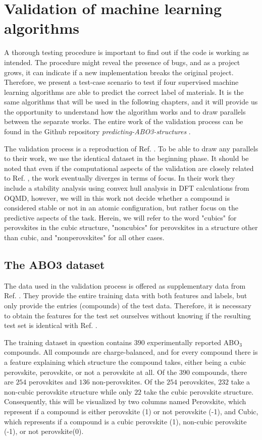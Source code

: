 \chapter{Validation of machine learning algorithms}
\label{chap:validation}

A thorough testing procedure is important to find out if the code is working as intended. The procedure might reveal the presence of bugs, and as a project grows, it can indicate if a new implementation breaks the original project. Therefore, we present a test-case scenario to test if four supervised machine learning algorithms are able to predict the correct label of materials. It is the same algorithms that will be used in the following chapters, and it will provide us the opportunity to understand how the algorithm works and to draw parallels between the separate works. The entire work of the validation process can be found in the Github repository \textit{predicting-ABO3-structures} \cite{Ohebbi2021a}.

The validation process is a reproduction of Ref. \cite{Balachandran2018}. To be able to draw any parallels to their work, we use the identical dataset in the beginning phase. It should be noted that even if the computational aspects of the validation are closely related to Ref. \cite{Balachandran2018}, the work eventually diverges in terms of focus. In their work they include a stability analysis using convex hull analysis in DFT calculations from OQMD, however, we will in this work not decide whether a compound is considered stable or not in an atomic configuration, but rather focus on the predictive aspects of the task. Herein, we will refer to the word "cubics" for perovskites in the cubic structure, "noncubics" for perovskites in a structure other than cubic, and "nonperovskites" for all other cases.

\section{The ABO3 dataset}

The data used in the validation process is offered as supplementary data from Ref. \cite{Balachandran2018}. They provide the entire training data with both features and labels, but only provide the entries (compounds) of the test data. Therefore, it is necessary to obtain the features for the test set ourselves without knowing if the resulting test set is identical with Ref. \cite{Balachandran2018}.

The training dataset in question contains $390$ experimentally reported ABO$_3$ compounds. All compounds are charge-balanced, and for every compound there is a feature explaining which structure the compound takes, either being a cubic perovskite, perovskite, or not a perovskite at all. Of the $390$ compounds, there are $254$ perovskites and $136$ non-perovskites. Of the $254$ perovskites, $232$ take a non-cubic perovskite structure while only $22$ take the cubic perovskite structure. Consequently, this will be visualized by two columns named Perovskite, which represent if a compound is either perovskite (1) or not perovskite (-1), and Cubic, which represents if a compound is a cubic perovskite (1), non-cubic perovskite (-1), or not perovskite(0).

